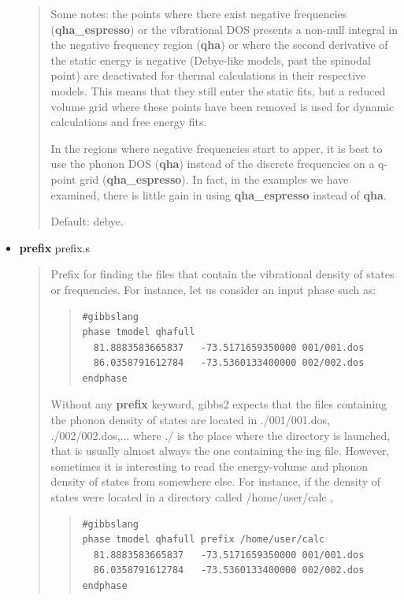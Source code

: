 \documentclass[a4paper]{article}
\begin{document}
\begin{itemize}
\begin{quote}
\begin{itemize}
\begin{description}
\end{description}

\end{itemize}

Some notes: the points where there exist negative
frequencies (\textbf{qha\_espresso}) or the vibrational DOS presents a
non-null integral in the negative frequency region (\textbf{qha}) or
where the second derivative of the static energy is negative
(Debye-like models, past the spinodal point) are deactivated for
thermal calculations in their respective models. This means that
they still enter the static fits, but a reduced volume grid where
these points have been removed is used for dynamic calculations and
free energy fits.

In the regions where negative frequencies start to apper, it is
best to use the phonon DOS (\textbf{qha}) instead of the discrete
frequencies on a q-point grid (\textbf{qha\_espresso}). In fact, in the
examples we have examined, there is little gain in using
\textbf{qha\_espresso} instead of \textbf{qha}.

Default: debye.

\end{quote}

\item \textbf{prefix} prefix.s
%
\begin{quote}

Prefix for finding the files that contain the vibrational density
of states or frequencies. For instance, let us consider an input
phase such as:
%
\begin{quote}
\begin{verbatim}
#gibbslang
phase tmodel qhafull
  81.8883583665837   -73.5171659350000 001/001.dos
  86.0358791612784   -73.5360133400000 002/002.dos
endphase
\end{verbatim}
\end{quote}

Without any \textbf{prefix} keyword, gibbs2 expects that the files
containing the phonon density of states are located in
./001/001.dos, ./002/002.dos,... where ./ is the place where the
directory is launched, that is usually almost always the one
containing the ing file. However, sometimes it is interesting to
read the energy-volume and phonon density of states from somewhere
else. For instance, if the density of states were located in a
directory called /home/user/calc ,
%
\begin{quote}
\begin{verbatim}
#gibbslang
phase tmodel qhafull prefix /home/user/calc
  81.8883583665837   -73.5171659350000 001/001.dos
  86.0358791612784   -73.5360133400000 002/002.dos
endphase
\end{verbatim}
\end{quote}


\end{quote}
\end{itemize}
\end{document}
